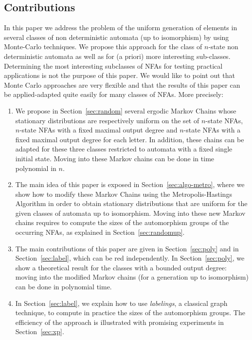 \subsection{Contributions}
In this paper we address the problem of the uniform generation of elements
in several classes of non deterministic automata (up to isomorphism) by
using Monte-Carlo techniques. We propose this approach for the class of
$n$-state non deterministic automata as well as for (a priori) more
interesting sub-classes. Determining the most interesting subclasses of NFAs
for testing practical applications is not the purpose of this paper. We
would like to point out that Monte Carlo approaches are very flexible and
that the results of this paper can be applied-adapted quite easily for many
classes of NFAs. More precisely:
\begin{enumerate}
\item We propose in Section~\ref{sec:random} several ergodic Markov Chains
whose stationary distributions are respectively uniform on the set of
$n$-state NFAs, $n$-state NFAs with a fixed maximal output degree and
$n$-state NFAs with a fixed maximal output degree for each letter. In
addition, these chains can be adapted for these three classes restricted to
automata with a fixed single initial state. Moving into these Markov chains
can be done in time polynomial in $n$.
\item The main idea of this paper is exposed in
Section~\ref{sec:algo-metro}, where we show how to modify these Markov
Chains using the Metropolis-Hastings Algorithm in order to obtain stationary
distributions that are uniform for the given classes of automata up to
isomorphism. Moving into these new Markov chains requires to compute the sizes
of the automorphism groups of the occurring NFAs, as explained in Section~\ref{sec:randomup}. 

\item The main contributions of this paper are given in
Section~\ref{sec:poly} and in Section~\ref{sec:label}, which can be
red independently. In Section~\ref{sec:poly}, we show a theoretical result for
the classes with a bounded output degree: moving into the modified Markov chains
(for a generation up to isomorphism) can be done in polynomial time. 

\item 
In Section~\ref{sec:label}, we explain how to use {\it labelings}, a classical
graph technique, to compute in practice the sizes of the automorphism
groups. The efficiency of the approach is illustrated with promising
experiments in Section~\ref{sec:xp}.
\end{enumerate}







